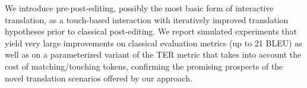 We introduce pre-post-editing, possibly the most basic form of interactive translation, as a touch-based interaction with iteratively improved translation hypotheses prior to classical post-editing. We report simulated experiments that yield very large improvements on classical evaluation metrics (up to 21 BLEU) as well as on a parameterized variant of the TER metric that takes into account the cost of matching/touching tokens, confirming the promising prospects of the novel translation scenarios offered by our approach.
